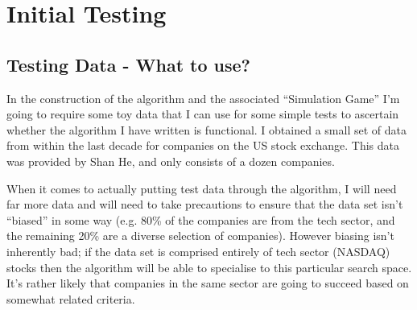 \section{Initial Testing}
\subsection{Testing Data - What to use?}
In the construction of the algorithm and the associated ``Simulation Game'' I'm going to require some toy data that I can use for some simple tests to ascertain whether the algorithm I have written is functional. I obtained a small set of data from within the last decade for companies on the US stock exchange. This data was provided by Shan He, and only consists of a dozen companies. \newline

When it comes to actually putting test data through the algorithm, I will need far more data and will need to take precautions to ensure that the data set isn't ``biased'' in some way (e.g. 80\% of the companies are from the tech sector, and the remaining 20\% are a diverse selection of companies). However biasing isn't inherently bad; if the data set is comprised entirely of tech sector (NASDAQ) stocks then the algorithm will be able to specialise to this particular search space. It's rather likely that companies in the same sector are going to succeed based on somewhat related criteria. \newline

